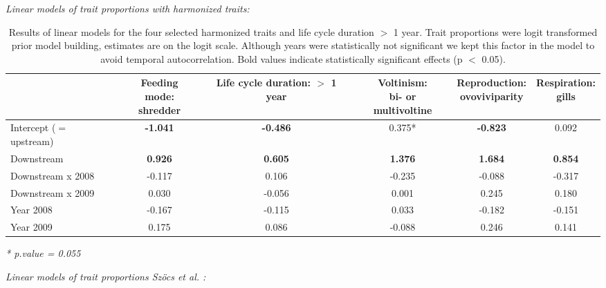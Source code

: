 \documentclass[../Draft_harmonization_paper.tex]{subfiles}
\begin{document}
\textit{Linear models of trait proportions with harmonized traits:}
\begin{table}[ht]
    \centering
    \caption{Results of linear models for the four selected harmonized traits and life cycle duration $>$ 1 year. Trait proportions were logit transformed prior model building, estimates are on the logit scale. Although years were statistically not significant we kept this factor in the model to avoid temporal autocorrelation. Bold values indicate statistically significant effects (p $<$ 0.05).}
    \label{stab:linear_models_new}
    \begin{tabular}{l|ccccc}
    \toprule[.1em]
    & \specialcell{Feeding mode:\\ shredder} & \specialcell{Life cycle duration:\\ $>$ 1 year} & \specialcell{Voltinism:\\ bi- or multivoltine} & \specialcell{Reproduction:\\ ovoviviparity} & \specialcell{Respiration:\\ gills} \\ 
    \toprule[.1em]
    Intercept ($=$ upstream) & \textbf{-1.041} & \textbf{-0.486} & 0.375* & \textbf{-0.823} & 0.092\\ 
    Downstream & \textbf{0.926} & \textbf{0.605} & \textbf{1.376} & \textbf{1.684} & \textbf{0.854}\\ 
    Downstream x 2008 & -0.117 & 0.106 & -0.235 & -0.088 & -0.317\\ 
    Downstream x 2009 & 0.030 & -0.056 & 0.001 & 0.245 & 0.180\\ 
    Year 2008 & -0.167 & -0.115 & 0.033 & -0.182 & -0.151\\ 
    Year 2009 & 0.175 & 0.086 & -0.088 & 0.246 & 0.141\\ 
    \bottomrule
    \end{tabular}
    \textit{* p.value = 0.055}
\end{table}
\newline
\newline
\newline
\textit{Linear models of trait proportions Szöcs et al. :}
\end{document}
